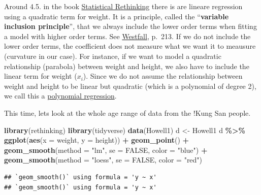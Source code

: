 \documentclass[
]{book}
\newenvironment{Shaded}{\begin{snugshade}}{\end{snugshade}}
\newcommand{\AttributeTok}[1]{\textcolor[rgb]{0.13,0.29,0.53}{#1}}
\newcommand{\ConstantTok}[1]{\textcolor[rgb]{0.56,0.35,0.01}{#1}}
\newcommand{\FunctionTok}[1]{\textcolor[rgb]{0.13,0.29,0.53}{\textbf{#1}}}
\newcommand{\NormalTok}[1]{#1}
\newcommand{\OtherTok}[1]{\textcolor[rgb]{0.56,0.35,0.01}{#1}}
\newcommand{\SpecialCharTok}[1]{\textcolor[rgb]{0.81,0.36,0.00}{\textbf{#1}}}
\newcommand{\StringTok}[1]{\textcolor[rgb]{0.31,0.60,0.02}{#1}}
\begin{document}
Around 4.5. in the book \href{https://civil.colorado.edu/~balajir/CVEN6833/bayes-resources/RM-StatRethink-Bayes.pdf}{Statistical Rethinking}
there is are lineare regression using a quadratic term for weight.
It is a principle, called the ``\textbf{variable inclusion principle}'', that we always include the lower order terms when fitting a model
with higher order terms. See \href{https://vdoc.pub/documents/understanding-regression-analysis-a-conditional-distribution-approach-84oqjr8sqva0}{Westfall},
p.~213. If we do not include the lower order terms, the coefficient does not measure what
we want it to meausure (curvature in our case). For instance, if we want to model a quadratic relationship (parabola) between
weight and height, we also have to include the linear term for weight (\(x_i\)).
Since we do not assume the relationship between weight and height to be linear but
quadratic (which is a polynomial of degree 2), we call this a
\href{https://en.wikipedia.org/wiki/Polynomial_regression\#:~:text=In\%20statistics\%2C\%20polynomial\%20regression\%20is,nth\%20degree\%20polynomial\%20in\%20x.}{polynomial regression}.

This time, lets look at the whole age range of data from the !Kung San people.

\begin{Shaded}
\begin{Highlighting}[]
\FunctionTok{library}\NormalTok{(rethinking)}
\FunctionTok{library}\NormalTok{(tidyverse)}
\FunctionTok{data}\NormalTok{(Howell1)}
\NormalTok{d }\OtherTok{\textless{}{-}}\NormalTok{ Howell1}
\NormalTok{d }\SpecialCharTok{\%\textgreater{}\%} \FunctionTok{ggplot}\NormalTok{(}\FunctionTok{aes}\NormalTok{(}\AttributeTok{x =}\NormalTok{ weight, }\AttributeTok{y =}\NormalTok{ height)) }\SpecialCharTok{+}
  \FunctionTok{geom\_point}\NormalTok{() }\SpecialCharTok{+}
  \FunctionTok{geom\_smooth}\NormalTok{(}\AttributeTok{method =} \StringTok{"lm"}\NormalTok{, }\AttributeTok{se =} \ConstantTok{FALSE}\NormalTok{, }\AttributeTok{color =} \StringTok{"blue"}\NormalTok{) }\SpecialCharTok{+}
  \FunctionTok{geom\_smooth}\NormalTok{(}\AttributeTok{method =} \StringTok{"loess"}\NormalTok{, }\AttributeTok{se =} \ConstantTok{FALSE}\NormalTok{, }\AttributeTok{color =} \StringTok{"red"}\NormalTok{)}
\end{Highlighting}
\end{Shaded}

\begin{verbatim}
## `geom_smooth()` using formula = 'y ~ x'
## `geom_smooth()` using formula = 'y ~ x'
\end{verbatim}
\end{document}
